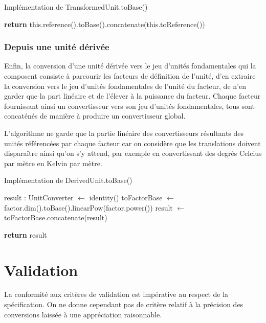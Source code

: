\documentclass[a4paper,twoside,10pt]{article}
\begin{document}
\begin{algorithm}[!h]
\caption{Implémentation de TransformedUnit.toBase()}\label{transformedToBase}
\begin{algorithmic}
\State \textbf{return} this.reference().toBase().concatenate(this.toReference())
\EndProcedure
\end{algorithmic}
\end{algorithm}


\subsubsection{Depuis une unité dérivée}

Enfin, la conversion d'une unité dérivée vers le jeu d'unités fondamentales qui la composent consiste à parcourir les
facteurs de définition de l'unité, d'en extraire la conversion vers le jeu d'unités fondamentales de l'unité du facteur,
de n'en garder que la part linéaire et de l'élever à la puissance du facteur. Chaque facteur fournissant ainsi un
convertisseur vers son jeu d'unités fondamentales, tous sont concaténés de manière à produire un convertisseur global.

L'algorithme ne garde que la partie linéaire des convertisseurs résultants des unités référencées par chaque facteur car
on considère que les translations doivent disparaître ainsi qu'on s'y attend, par exemple en convertissant des degrés
Celcius par mètre en Kelvin par mètre.

\begin{algorithm}[!h]
\caption{Implémentation de DerivedUnit.toBase()}\label{derivedToBase}
\begin{algorithmic}

\State result : UnitConverter $\gets$ identity()
\State toFactorBase $\gets$ factor.dim().toBase().linearPow(factor.power())
\State result $\gets$ toFactorBase.concatenate(result)
\EndFor

\State \textbf{return} result
\EndProcedure
\end{algorithmic}
\end{algorithm}

\section{Validation}

La conformité aux critères de validation est impérative au respect de la spécification. On ne donne cependant pas de
critère relatif à la précision des conversions laissée à une appréciation raisonnable.
\end{document}
